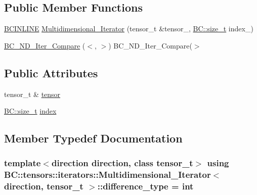 \subsection*{Public Member Functions}
\begin{DoxyCompactItemize}
\item 
\hyperlink{BlackCat__Common_8h_a6699e8b0449da5c0fafb878e59c1d4b1}{B\+C\+I\+N\+L\+I\+NE} \hyperlink{structBC_1_1tensors_1_1iterators_1_1Multidimensional__Iterator_ac6974f656a9df51a8b20e96c82b76987}{Multidimensional\+\_\+\+Iterator} (tensor\+\_\+t \&tensor\+\_\+, \hyperlink{namespaceBC_a6007cbc4eeec401a037b558910a56173}{B\+C\+::size\+\_\+t} index\+\_)
\item 
\hyperlink{structBC_1_1tensors_1_1iterators_1_1Multidimensional__Iterator_a5ab094be1ba44cbbb1fa136a55e1e4d3}{B\+C\+\_\+\+N\+D\+\_\+\+Iter\+\_\+\+Compare} ($<$, $>$) B\+C\+\_\+\+N\+D\+\_\+\+Iter\+\_\+\+Compare($>$
\end{DoxyCompactItemize}
\subsection*{Public Attributes}
\begin{DoxyCompactItemize}
\item 
tensor\+\_\+t \& \hyperlink{structBC_1_1tensors_1_1iterators_1_1Multidimensional__Iterator_a278ffdb16ff61939d9f995c6664b7dbc}{tensor}
\item 
\hyperlink{namespaceBC_a6007cbc4eeec401a037b558910a56173}{B\+C\+::size\+\_\+t} \hyperlink{structBC_1_1tensors_1_1iterators_1_1Multidimensional__Iterator_af979c046e9e21c8b1624405069490962}{index}
\end{DoxyCompactItemize}


\subsection{Member Typedef Documentation}
\subsubsection[{\texorpdfstring{difference\+\_\+type}{difference_type}}]{\setlength{\rightskip}{0pt plus 5cm}template$<$direction direction, class tensor\+\_\+t$>$ using {\bf B\+C\+::tensors\+::iterators\+::\+Multidimensional\+\_\+\+Iterator}$<$ {\bf direction}, tensor\+\_\+t $>$\+::{\bf difference\+\_\+type} =  int}\hypertarget{structBC_1_1tensors_1_1iterators_1_1Multidimensional__Iterator_ad5a1d1036eaf2d644e1e3e62ed30ceae}{}\label{structBC_1_1tensors_1_1iterators_1_1Multidimensional__Iterator_ad5a1d1036eaf2d644e1e3e62ed30ceae}
